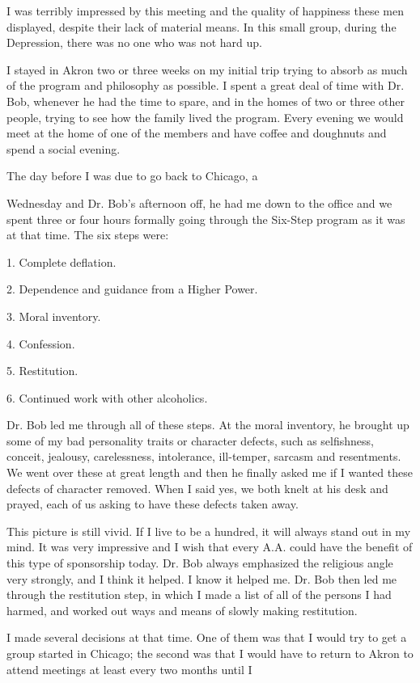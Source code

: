 \begin{biblechapter}
I was terribly impressed by this meeting and the quality of happiness these men displayed, despite their lack of material means. In this small group, during the Depression, there was no one who was not hard up.

I stayed in Akron two or three weeks on my initial trip trying to absorb as much of the program and philosophy as possible. I spent a great deal of time with Dr. Bob, whenever he had the time to spare, and in the homes of two or three other people, trying to see how the family lived the program. Every evening we would meet at the home of one of the members and have coffee and doughnuts and spend a social evening.

The day before I was due to go back to Chicago, a

Wednesday and Dr. Bob’s afternoon off, he had me down to the office and we spent three or four hours formally going through the Six-Step program as it was at that time. The six steps were:

1. Complete deflation.

2. Dependence and guidance from a Higher Power.

3. Moral inventory.

4. Confession.

5. Restitution.

6. Continued work with other alcoholics.

Dr. Bob led me through all of these steps. At the moral inventory, he brought up some of my bad personality traits or character defects, such as selfishness, conceit, jealousy, carelessness, intolerance, ill-temper, sarcasm and resentments. We went over these at great length and then he finally asked me if I wanted these defects of character removed. When I said yes, we both knelt at his desk and prayed, each of us asking to have these defects taken away.

This picture is still vivid. If I live to be a hundred, it will always stand out in my mind. It was very impressive and I wish that every A.A. could have the benefit of this type of sponsorship today. Dr. Bob always emphasized the religious angle very strongly, and I think it helped. I know it helped me. Dr. Bob then led me through the restitution step, in which I made a list of all of the persons I had harmed, and worked out ways and means of slowly making restitution.

I made several decisions at that time. One of them was that I would try to get a group started in Chicago; the second was that I would have to return to Akron to attend meetings at least every two months until I


\end{biblechapter}
